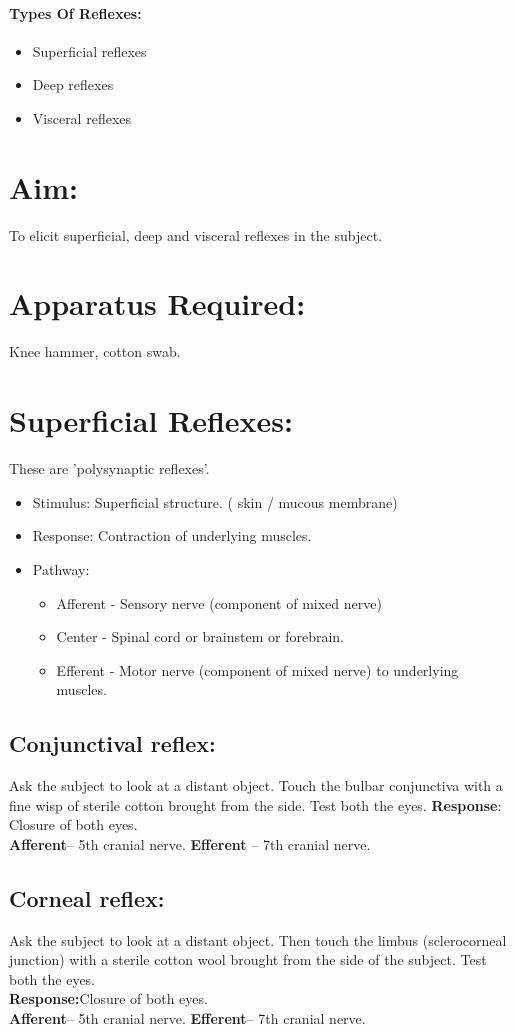 \documentclass[a4paper,12pt]{book}
\begin{document}
\paragraph{Types Of Reflexes:}
\begin{itemize}
\item{Superficial reflexes}
\item{Deep reflexes}
\item{Visceral reflexes}
\end{itemize}
\section*{Aim:} 
To elicit superficial, deep and visceral reflexes in the subject.
\section*{Apparatus Required:}
Knee hammer, cotton swab.
\section*{Superficial Reflexes: }
These are 'polysynaptic reflexes'.
\begin{itemize}
\item{Stimulus: Superficial structure. ( skin / mucous membrane)}
\item{Response: Contraction of underlying muscles.}
\item{Pathway:}
	\begin{itemize}
\item{Afferent - Sensory nerve (component of mixed nerve)}
\item{Center - Spinal cord or brainstem or forebrain.}
\item{Efferent - Motor nerve (component of mixed nerve) to underlying muscles.}
	\end{itemize}
\end{itemize}
\subsection*{Conjunctival reflex:}
	Ask the subject to look at a distant object. Touch the bulbar conjunctiva with a fine wisp of sterile cotton brought from the side. Test both the eyes.\newline
\textbf{Response}: Closure of both eyes.\\  
\textbf{Afferent}– 5th cranial nerve. \textbf{Efferent} – 7th cranial nerve.
\subsection*{Corneal reflex:}
Ask the subject to look at a distant object. Then touch the limbus (sclerocorneal junction) with a sterile cotton wool brought from the side of the subject. Test both the eyes.\\
\textbf{Response:}Closure of both eyes.\\
\textbf{Afferent}– 5th cranial nerve. \textbf{Efferent}– 7th cranial nerve.
\end{document}
